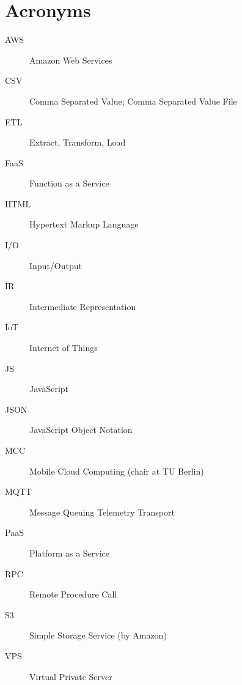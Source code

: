 \documentclass[../main.tex]{subfiles}
\begin{document}
\chapter{Acronyms}

\begin{description}
  \item[AWS] Amazon Web Services
  \item[CSV] Comma Separated Value; Comma Separated Value File 
  \item[ETL] Extract, Transform, Load
  \item[FaaS] Function as a Service
  \item[HTML] Hypertext Markup Language
  \item[I/O] Input/Output
  \item[IR] Intermediate Representation
  \item[IoT] Internet of Things
  \item[JS] JavaScript
  \item[JSON] JavaScript Object Notation
  \item[MCC] Mobile Cloud Computing (chair at TU Berlin)
  \item[MQTT] Message Queuing Telemetry Transport
  \item[PaaS] Platform as a Service
  \item[RPC] Remote Procedure Call
  \item[S3] Simple Storage Service (by Amazon)
  \item[VPS] Virtual Private Server
\end{description}

\end{document}
